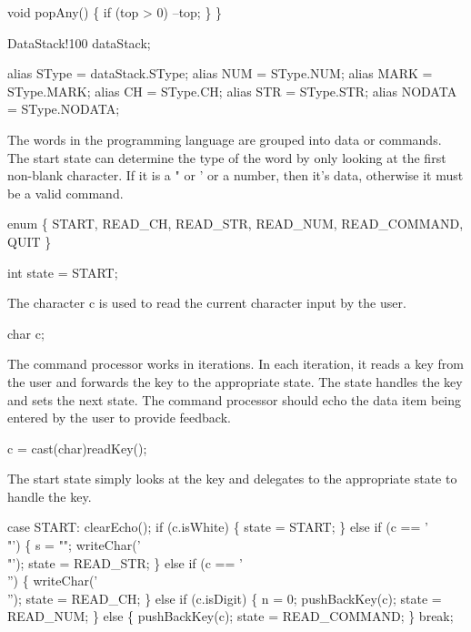   void popAny()
  \{
    if (top > 0) --top;
  \}
\}

DataStack!100 dataStack;

alias SType  = dataStack.SType;
alias NUM    = SType.NUM;
alias MARK   = SType.MARK;
alias CH     = SType.CH;
alias STR    = SType.STR;
alias NODATA = SType.NODATA;

\nwendcode{}The words in the programming language are grouped into data or
commands. The start state can determine the type of the word by only
looking at the first non-blank character. If it is a " or ' or a
number, then it's data, otherwise it must be a valid command.

\nwenddocs{}\endmoddef\nwstartdeflinemarkup\nwenddeflinemarkup
enum \{
  START,
  READ_CH,
  READ_STR,
  READ_NUM,
  READ_COMMAND,
  QUIT
\}

int state = START;

\nwendcode{}The character {\Tt{}c\nwendquote} is used to read the current character input by
the user.

\nwenddocs{}\endmoddef\nwstartdeflinemarkup\nwenddeflinemarkup
char c;

\nwendcode{}The command processor works in iterations. In each iteration, it
reads a key from the user and forwards the key to the appropriate
state. The state handles the key and sets the next state. The command
processor should echo the data item being entered by the user to
provide feedback.

\nwenddocs{}\endmoddef\nwstartdeflinemarkup\nwenddeflinemarkup
c   = cast(char)readKey();

\nwendcode{}The start state simply looks at the key and delegates to the
appropriate state to handle the key.

\nwenddocs{}\endmoddef\nwstartdeflinemarkup\nwenddeflinemarkup
case START:
  clearEcho();
  if (c.isWhite) \{
    state = START;
  \} else if (c == '\\"') \{
    s = "";
    writeChar('\\"');
    state = READ_STR;
  \} else if (c == '\\'') \{
    writeChar('\\'');
    state = READ_CH;
  \} else if (c.isDigit) \{
    n = 0;
    pushBackKey(c);
    state = READ_NUM;
  \} else \{
    pushBackKey(c);
    state = READ_COMMAND;
  \}
  break;

